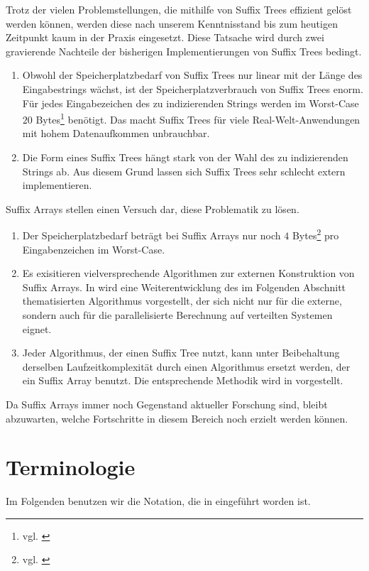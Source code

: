 \documentclass[12pt]{report}
\begin{document}
Trotz der vielen Problemstellungen, die mithilfe von Suffix Trees effizient gelöst werden können, werden diese nach unserem Kenntnisstand bis zum heutigen Zeitpunkt kaum in der Praxis eingesetzt. Diese Tatsache wird durch zwei gravierende Nachteile der bisherigen Implementierungen von Suffix Trees bedingt.
\begin{enumerate}
    \item Obwohl der Speicherplatzbedarf von Suffix Trees nur linear mit der Länge des Eingabestrings wächst, ist der Speicherplatzverbrauch von Suffix Trees enorm. Für jedes Eingabezeichen des zu indizierenden Strings werden im Worst-Case $20$ Bytes\footnote{vgl. \cite{Giegerich1999}} benötigt. Das macht Suffix Trees für viele Real-Welt-Anwendungen mit hohem Datenaufkommen unbrauchbar.
    \item Die Form eines Suffix Trees hängt stark von der Wahl des zu indizierenden Strings ab. Aus diesem Grund lassen sich Suffix Trees sehr schlecht extern implementieren.
\end{enumerate}
Suffix Arrays stellen einen Versuch dar, diese Problematik zu lösen.
\begin{enumerate}
    \item Der Speicherplatzbedarf beträgt bei Suffix Arrays nur noch $4$ Bytes\footnote{vgl. \cite{Abouelhoda2004}} pro Eingabenzeichen im Worst-Case.
    \item Es exisitieren vielversprechende Algorithmen zur externen Konstruktion von Suffix Arrays. In \cite{Dementiev2008} wird eine Weiterentwicklung des im Folgenden Abschnitt thematisierten Algorithmus vorgestellt, der sich nicht nur für die externe, sondern auch für die parallelisierte Berechnung auf verteilten Systemen eignet.
    \item Jeder Algorithmus, der einen Suffix Tree nutzt, kann unter Beibehaltung derselben Laufzeitkomplexität durch einen Algorithmus ersetzt werden, der ein Suffix Array benutzt. Die entsprechende Methodik wird in \cite{Abouelhoda2004} vorgestellt.
\end{enumerate}
Da Suffix Arrays immer noch Gegenstand aktueller Forschung sind, bleibt abzuwarten, welche Fortschritte in diesem Bereich noch erzielt werden können.

\section{Terminologie}
\label{sec:Terminologie}
Im Folgenden benutzen wir die Notation, die in \cite{Karkkainen2006} eingeführt worden ist.
\end{document}
